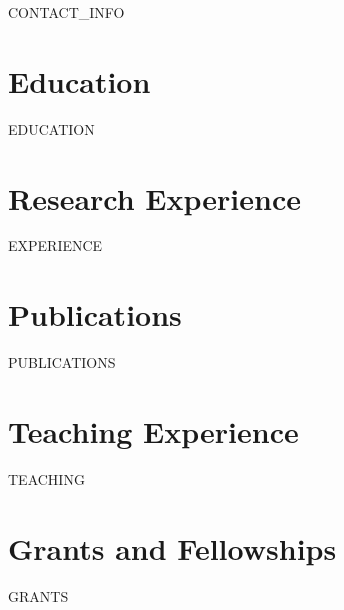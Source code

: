 \documentclass[11pt,a4paper,serif]{article}
\begin{document}
{{CONTACT_INFO}}

\section{Education}
{{EDUCATION}}

\section{Research Experience}
{{EXPERIENCE}}

\section{Publications}
{{PUBLICATIONS}}

\section{Teaching Experience}
{{TEACHING}}

\section{Grants and Fellowships}
{{GRANTS}}

\end{document}
